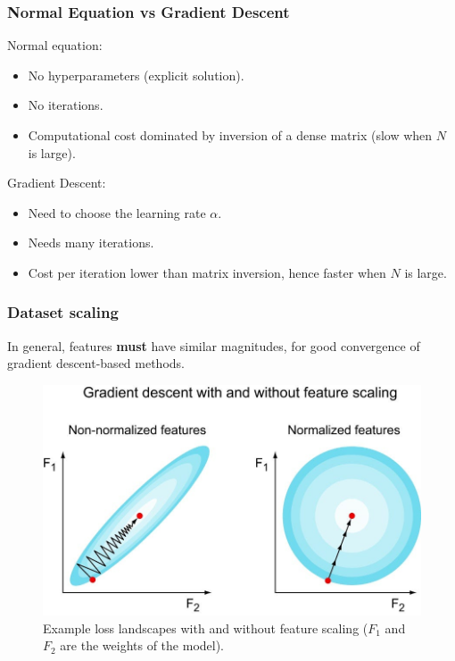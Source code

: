 \documentclass{beamer}
\begin{document}
	\begin{frame}
		\frametitle{Normal Equation vs Gradient Descent}
		Normal equation:
		\begin{itemize}
			\item No hyperparameters (explicit solution).
			\item No iterations.
			\item Computational cost dominated by inversion of a dense matrix (slow when $N$ is large).
		\end{itemize}
	
		\vspace{5mm}
	
		Gradient Descent:
		\begin{itemize}
			\item Need to choose the learning rate $\alpha$.
			\item Needs many iterations.
			\item Cost per iteration lower than matrix inversion, hence faster when $N$ is large.
		\end{itemize}
	\end{frame}


	\begin{frame}
		\frametitle{Dataset scaling}
		In general, features \textbf{must} have similar magnitudes, for good convergence of gradient descent-based methods.
		\vspace{1mm}
		
		\begin{figure}
			\centering
			\includegraphics[scale=0.3]{images/feature-scaling}
			\caption{Example loss landscapes with and without feature scaling ($F_1$ and $F_2$ are the weights of the model).}
		\end{figure}
	\end{frame}
\end{document}
